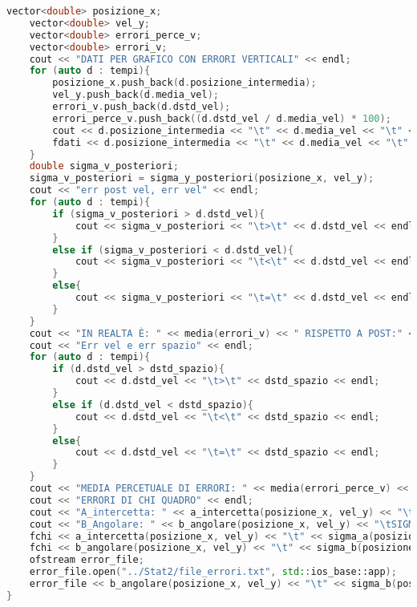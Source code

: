 \documentclass[a4paper,11pt,oneside]{article}
\begin{document}
\begin{lstlisting}[language=C++, label=lst:seconda_analisi.cxx, caption=seconda\_analisi.cxx]
    vector<double> posizione_x;
    vector<double> vel_y;
    vector<double> errori_perce_v;
    vector<double> errori_v;
    cout << "DATI PER GRAFICO CON ERRORI VERTICALI" << endl;
    for (auto d : tempi){
        posizione_x.push_back(d.posizione_intermedia);
        vel_y.push_back(d.media_vel);
        errori_v.push_back(d.dstd_vel);
        errori_perce_v.push_back((d.dstd_vel / d.media_vel) * 100);
        cout << d.posizione_intermedia << "\t" << d.media_vel << "\t" << d.dstd_vel << endl;
        fdati << d.posizione_intermedia << "\t" << d.media_vel << "\t" << d.dstd_vel << endl;
    }
    double sigma_v_posteriori;
    sigma_v_posteriori = sigma_y_posteriori(posizione_x, vel_y);
    cout << "err post vel, err vel" << endl;
    for (auto d : tempi){
        if (sigma_v_posteriori > d.dstd_vel){
            cout << sigma_v_posteriori << "\t>\t" << d.dstd_vel << endl;
        }
        else if (sigma_v_posteriori < d.dstd_vel){
            cout << sigma_v_posteriori << "\t<\t" << d.dstd_vel << endl;
        }
        else{
            cout << sigma_v_posteriori << "\t=\t" << d.dstd_vel << endl;
        }
    }
    cout << "IN REALTA È: " << media(errori_v) << " RISPETTO A POST:" << sigma_v_posteriori << endl;
    cout << "Err vel e err spazio" << endl;
    for (auto d : tempi){
        if (d.dstd_vel > dstd_spazio){
            cout << d.dstd_vel << "\t>\t" << dstd_spazio << endl;
        }
        else if (d.dstd_vel < dstd_spazio){
            cout << d.dstd_vel << "\t<\t" << dstd_spazio << endl;
        }
        else{
            cout << d.dstd_vel << "\t=\t" << dstd_spazio << endl;
        }
    }
    cout << "MEDIA PERCETUALE DI ERRORI: " << media(errori_perce_v) << endl;
    cout << "ERRORI DI CHI QUADRO" << endl;
    cout << "A_intercetta: " << a_intercetta(posizione_x, vel_y) << "\tSIGMA_A: " << sigma_a(posizione_x, vel_y) << endl;
    cout << "B_Angolare: " << b_angolare(posizione_x, vel_y) << "\tSIGMA_B: " << sigma_b(posizione_x, vel_y) << endl;
    fchi << a_intercetta(posizione_x, vel_y) << "\t" << sigma_a(posizione_x, vel_y) << endl;
    fchi << b_angolare(posizione_x, vel_y) << "\t" << sigma_b(posizione_x, vel_y) << endl;
    ofstream error_file;
    error_file.open("../Stat2/file_errori.txt", std::ios_base::app);
    error_file << b_angolare(posizione_x, vel_y) << "\t" << sigma_b(posizione_x, vel_y) << endl;
}
\end{lstlisting}
\end{document}

